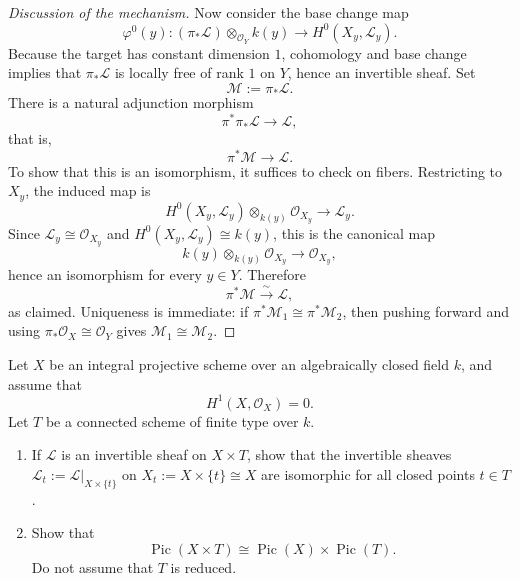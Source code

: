 \documentclass[12pt]{article}
\begin{document}
\begin{proof}[Discussion of the mechanism]
    Now consider the base change map
    \[
        \varphi^0(y):(\pi_*\mathcal L)\otimes_{\mathcal O_Y} k(y)\longrightarrow H^0(X_y,\mathcal L_y).
    \]
    Because the target has constant dimension \(1\), cohomology and base change implies that
    \(\pi_*\mathcal L\) is locally free of rank \(1\) on \(Y\), hence an invertible sheaf.
    Set
    \[
        \mathcal M:=\pi_*\mathcal L.
    \]
    There is a natural adjunction morphism
    \[
        \pi^*\pi_*\mathcal L \longrightarrow \mathcal L,
    \]
    that is,
    \[
        \pi^*\mathcal M \longrightarrow \mathcal L.
    \]
    To show that this is an isomorphism, it suffices to check on fibers.
    Restricting to \(X_y\), the induced map is
    \[
        H^0(X_y,\mathcal L_y)\otimes_{k(y)} \mathcal O_{X_y}\longrightarrow \mathcal L_y.
    \]
    Since \(\mathcal L_y\cong \mathcal O_{X_y}\) and \(H^0(X_y,\mathcal L_y)\cong k(y)\), this is the canonical map
    \[
        k(y)\otimes_{k(y)}\mathcal O_{X_y}\longrightarrow \mathcal O_{X_y},
    \]
    hence an isomorphism for every \(y\in Y\).
    Therefore
    \[
        \pi^*\mathcal M \xrightarrow{\sim} \mathcal L,
    \]
    as claimed. Uniqueness is immediate: if \(\pi^*\mathcal M_1\cong \pi^*\mathcal M_2\), then pushing forward and using
    \(\pi_*\mathcal O_X\cong \mathcal O_Y\) gives \(\mathcal M_1\cong \mathcal M_2\).
\end{proof}

\begin{exercise}
    Let $X$ be an integral projective scheme over an algebraically closed field $k$, and assume that
    \[
        H^1(X,\mathcal O_X)=0.
    \]
    Let $T$ be a connected scheme of finite type over $k$.
    \begin{enumerate}
        \item If $\mathcal L$ is an invertible sheaf on $X\times T$, show that the invertible sheaves $\mathcal L_t:=\mathcal L|_{X\times \{t\}}$
              on $X_t:=X\times \{t\}\cong X$
              are isomorphic for all closed points $t\in T$.

        \item Show that
              \[
                  \operatorname{Pic}(X\times T)\cong \operatorname{Pic}(X)\times \operatorname{Pic}(T).
              \]
              Do not assume that $T$ is reduced.
    \end{enumerate}
\end{exercise}
\end{document}

